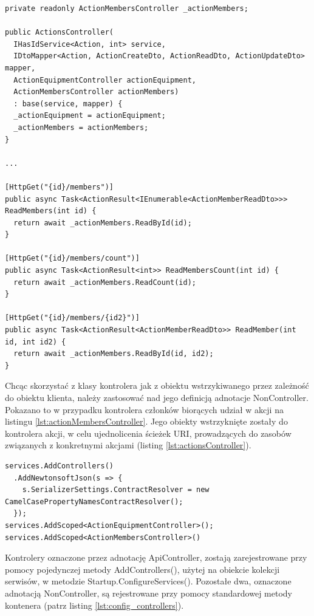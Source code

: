 \begin{lstlisting}[language=CSharp, caption={Fragment kontrolera akcji, wykorzystujący wstrzyknięcie kontrolera członków biorących udział w akcji}, label=lst:actionsController]
private readonly ActionMembersController _actionMembers;

public ActionsController(
  IHasIdService<Action, int> service,
  IDtoMapper<Action, ActionCreateDto, ActionReadDto, ActionUpdateDto> mapper,
  ActionEquipmentController actionEquipment,
  ActionMembersController actionMembers)
  : base(service, mapper) {
  _actionEquipment = actionEquipment;
  _actionMembers = actionMembers;
}

...

[HttpGet("{id}/members")]
public async Task<ActionResult<IEnumerable<ActionMemberReadDto>>> ReadMembers(int id) {
  return await _actionMembers.ReadById(id);
}

[HttpGet("{id}/members/count")]
public async Task<ActionResult<int>> ReadMembersCount(int id) {
  return await _actionMembers.ReadCount(id);
}

[HttpGet("{id}/members/{id2}")]
public async Task<ActionResult<ActionMemberReadDto>> ReadMember(int id, int id2) {
  return await _actionMembers.ReadById(id, id2);
}
\end{lstlisting}

Chcąc skorzystać z klasy kontrolera jak z obiektu wstrzykiwanego przez zależność do obiektu klienta, należy zastosować nad jego definicją adnotacje NonController. Pokazano to w przypadku kontrolera członków biorących udział w akcji na listingu \ref{lst:actionMembersController}. Jego obiekty wstrzyknięte zostały do kontrolera akcji, w celu ujednolicenia ścieżek URI, prowadzących do zasobów związanych z konkretnymi akcjami (listing \ref{lst:actionsController}).

\begin{lstlisting}[language=CSharp, caption={Rejestracja kontrolerów aplikacji w metodzie Startup.ConfigureServices()}, label=lst:config_controllers]
services.AddControllers()
  .AddNewtonsoftJson(s => {
    s.SerializerSettings.ContractResolver = new CamelCasePropertyNamesContractResolver();
  });
services.AddScoped<ActionEquipmentController>();
services.AddScoped<ActionMembersController>()
\end{lstlisting}

Kontrolery oznaczone przez adnotację ApiController, zostają zarejestrowane przy pomocy pojedynczej metody AddControllers(), użytej na obiekcie kolekcji serwisów, w metodzie Startup.ConfigureServices(). Pozostałe dwa, oznaczone adnotacją NonController, są rejestrowane przy pomocy standardowej metody kontenera (patrz listing \ref{lst:config_controllers}).

